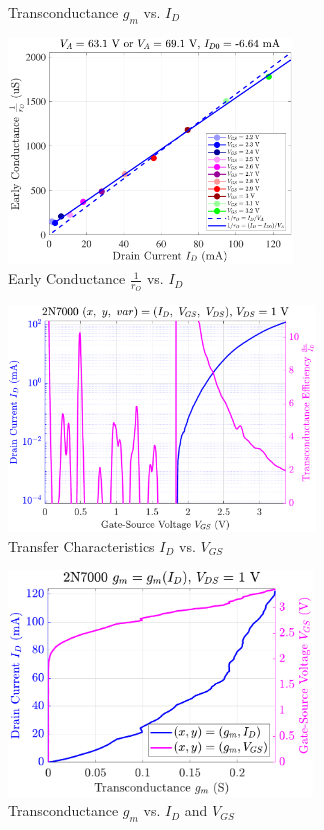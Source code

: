 \documentclass[UTF8]{article}
\begin{document}
\begin{center}
\begin{minipage}{0.45\columnwidth}
\begin{figure}[H]
            \caption{Transconductance $g_m$ vs. $I_D$}
        \end{figure}
    \end{minipage}\hfill\begin{minipage}{0.45\columnwidth}
        \begin{figure}[H]\centering
            \includegraphics[height=170pt]{LCE-04-场效应管/assets/2N7000 (NMOS) [onsemi, KH32] current level high/2025-04-24_00-52-26__stc_rO_Id_Vgs.pdf}
            \caption{Early Conductance $\frac{1}{r_O}$ vs. $I_D$}
        \end{figure}
        \begin{figure}[H]\centering
            \includegraphics[height=170pt]{LCE-04-场效应管/assets/2N7000 (NMOS) [onsemi, KH32] current level high/2025-04-24_00-55-13__stc_Id_Vgs_Vds_logscale.pdf}
            \caption{Transfer Characteristics $I_D$ vs. $V_{GS}$}
        \end{figure}
        \begin{figure}[H]\centering
            \includegraphics[height=170pt]{LCE-04-场效应管/assets/2N7000 (NMOS) [onsemi, KH32] current level high/2025-04-24_00-52-35__stc_gm_IdVgs_yyplot.pdf}
            \caption{Transconductance $g_m$ vs. $I_D$ and $V_{GS}$}
    \end{figure}
\end{minipage}\end{center}
\end{document}
